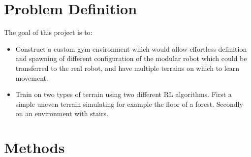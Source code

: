 \documentclass{article}
\begin{document}
\section{Problem Definition}
The goal of this project is to:
\begin{itemize}
    \item Construct a custom gym environment which would allow effortless definition and spawning of different configuration of the modular robot which could be transferred to the real robot, and have multiple terrains on which to learn movement.
    \item Train on two types of terrain using two different RL algorithms. First a simple uneven terrain simulating for example the floor of a forest.
      Secondly on an environment with stairs.
\end{itemize}

\section{Methods}
\end{document}
